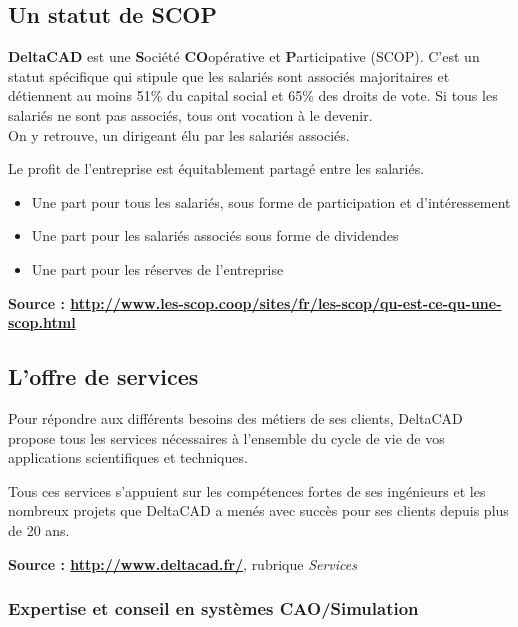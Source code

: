 \subsection{Un statut de SCOP}

\textbf{DeltaCAD} est une \textbf{S}ociété  \textbf{CO}opérative et \textbf{P}articipative (SCOP). C'est un statut spécifique qui stipule que les salariés sont associés majoritaires et détiennent au moins 51\% du capital social et 65\% des droits de vote. Si tous les salariés ne sont pas associés, tous ont vocation à le devenir.\\
On y retrouve, un dirigeant élu par les salariés associés.

Le profit de l'entreprise est équitablement partagé entre les salariés.
\begin{itemize}
  \item Une part pour tous les salariés, sous forme de participation et d’intéressement
  \item Une part pour les salariés associés sous forme de dividendes
  \item Une part pour les réserves de l’entreprise 
\end{itemize}
\vspace{5mm}

\textbf{Source : \url{http://www.les-scop.coop/sites/fr/les-scop/qu-est-ce-qu-une-scop.html}}

\subsection{L'offre de services}

Pour répondre aux différents besoins des métiers de ses clients, DeltaCAD propose tous les services nécessaires à l'ensemble du cycle de vie de vos applications scientifiques et techniques.

Tous ces services s'appuient sur les compétences fortes de ses ingénieurs et les nombreux projets que DeltaCAD a menés avec succès pour ses clients depuis plus de 20 ans.

\textbf{Source : \url{http://www.deltacad.fr/}}, rubrique \textit{Services}

\subsubsection{Expertise et conseil en systèmes CAO/Simulation}

